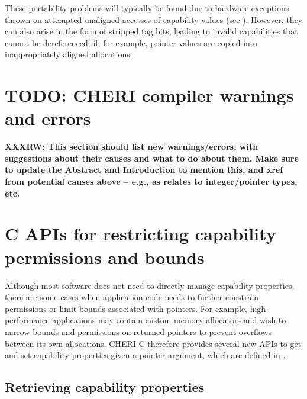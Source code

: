 \documentclass[12pt,twoside,openright,a4paper]{article}
\newcommand{\ccode}[1]{{\small\ttfamily{#1}}}
\newcommand{\pathname}[1]{{\ccode{#1}}}
\newcommand{\note}[2]{{\color{blue}[ Note: #1 - #2]}}
\renewcommand{\note}[2]{\relax\ifhmode\unskip\fi}
\newcommand{\rwnote}[1]{\note{#1}{Robert W.}}
\newcommand{\amnote}[1]{\note{#1}{Alfredo M.}}
\begin{document}
These portability problems will typically be found due to hardware exceptions
thrown on attempted unaligned accesses of capability values
(see ).
However, they can also arise in the form of stripped tag bits, leading to
invalid capabilities that cannot be dereferenced, if, for example, pointer
values are copied into inappropriately aligned allocations.

\section{TODO: CHERI compiler warnings and errors}

\textbf{XXXRW: This section should list new warnings/errors, with suggestions
  about their causes and what to do about them.  Make sure to update the
  Abstract and Introduction to mention this, and xref from potential causes
  above -- e.g., as relates to integer/pointer types, etc.}

\section{C APIs for restricting capability permissions and bounds}
\label{sec:setbounds}

\rwnote{I wonder if we should talk more about permissions?  Perhaps not in
  this document, in which case possibly we should talk about them less?}
\amnote{If this is intended as a document to guide porting efforts perhaps
  we should only mention them as background info? If this becomes a summary
  of CHERI programming patterns then we probably want a section that talks
  about permissions as well.}

Although most software does not need to directly manage capability properties,
there are some cases when application code needs to further constrain
permissions or limit bounds associated with pointers.
For example, high-performance applications may contain custom memory
allocators and wish to narrow bounds and permissions on returned pointers
to prevent overflows between its own allocations.
CHERI C therefore provides several new APIs to get and set capability
properties given a pointer argument, which are defined in
\pathname{cheri/cheric.h}.
\amnote{We should make it clear that we are referring to headers in the CheriBSD tree.}

\subsection{Retrieving capability properties}
\end{document}
